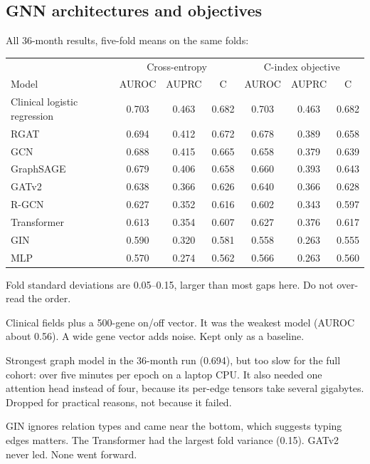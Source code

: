 \documentclass[11pt,a4paper]{article}
\begin{document}
\subsection{GNN architectures and objectives}
All 36-month results, five-fold means on the same folds:
\begin{center}
\small
\begin{tabular}{lccc|ccc}
\toprule
& \multicolumn{3}{c|}{Cross-entropy} & \multicolumn{3}{c}{C-index objective} \\
Model & AUROC & AUPRC & C & AUROC & AUPRC & C \\
\midrule
Clinical logistic regression & 0.703 & 0.463 & 0.682 & 0.703 & 0.463 & 0.682 \\
RGAT & 0.694 & 0.412 & 0.672 & 0.678 & 0.389 & 0.658 \\
GCN & 0.688 & 0.415 & 0.665 & 0.658 & 0.379 & 0.639 \\
GraphSAGE & 0.679 & 0.406 & 0.658 & 0.660 & 0.393 & 0.643 \\
GATv2 & 0.638 & 0.366 & 0.626 & 0.640 & 0.366 & 0.628 \\
R-GCN & 0.627 & 0.352 & 0.616 & 0.602 & 0.343 & 0.597 \\
Transformer & 0.613 & 0.354 & 0.607 & 0.627 & 0.376 & 0.617 \\
GIN & 0.590 & 0.320 & 0.581 & 0.558 & 0.263 & 0.555 \\
MLP & 0.570 & 0.274 & 0.562 & 0.566 & 0.263 & 0.560 \\
\bottomrule
\end{tabular}
\end{center}
Fold standard deviations are 0.05--0.15, larger than most gaps here. Do not over-read the order.
\begin{dropbox}
Clinical fields plus a 500-gene on/off vector. It was the weakest model (AUROC about 0.56). A wide gene vector adds noise. Kept only as a baseline.
\end{dropbox}
\begin{dropbox}
Strongest graph model in the 36-month run (0.694), but too slow for the full cohort: over five minutes per epoch on a laptop CPU. It also needed one attention head instead of four, because its per-edge tensors take several gigabytes. Dropped for practical reasons, not because it failed.
\end{dropbox}
\begin{dropbox}
GIN ignores relation types and came near the bottom, which suggests typing edges matters. The Transformer had the largest fold variance (0.15). GATv2 never led. None went forward.
\end{dropbox}
\end{document}
